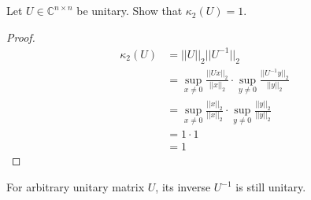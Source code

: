 \documentclass[11pt,a4paper]{article}
\begin{document}
\newpage
\section{}

\newpage
\section{}

Let $U \in \mathbb{C}^{n\times n}$ be unitary. Show that $\kappa_2(U) = 1$.
\begin{proof}
    \begin{align}
        \kappa_2 (U) &= || U ||_2 || U^{-1} ||_2  \\
        & = \sup_{x\not = 0} \frac{|| U x ||_2}{|| x ||_2} \cdot
        \sup_{y\not = 0} \frac{|| U^{-1} y ||_2}{|| y ||_2} \\
        & = \sup_{x\not = 0} \frac{|| x ||_2}{|| x ||_2} \cdot
        \sup_{y\not = 0} \frac{|| y ||_2}{|| y ||_2} \\
        & = 1 \cdot 1 \\
        & = 1
    \end{align}
\end{proof}

\begin{lemma}
    For arbitrary unitary matrix $U$, its inverse $U^{-1}$ is still unitary. 
\end{lemma}
\end{document}
